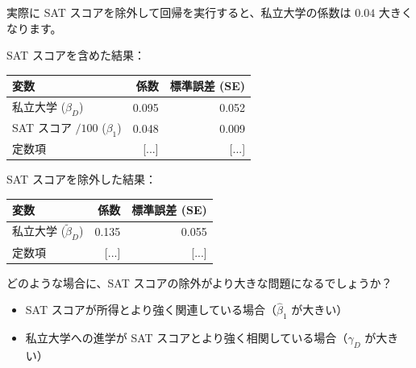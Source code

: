 \documentclass[11pt,handout]{beamer}
\newenvironment{wideitemize}{\itemize\addtolength{\itemsep}{10pt}}{\enditemize}
\begin{document}
\begin{frame}
	\begin{wideitemize}
		\item
		実際に SAT スコアを除外して回帰を実行すると、私立大学の係数は $0.04$ 大きくなります。
		
		\item
		SAT スコアを含めた結果：
		
		\begin{tabular}{lrr}
			変数 & 係数 & 標準誤差 (SE) \\ \hline
			私立大学 ($\beta_D$) & 0.095 & 0.052 \\
			SAT スコア $/ 100$ ($\beta_1$) & 0.048 & 0.009 \\
			定数項 & [...] & [...]
		\end{tabular}
		
		
		\item
		SAT スコアを除外した結果：
		\begin{tabular}{lrr}
			変数 & 係数 & 標準誤差 (SE) \\ \hline
			私立大学 ($\tilde\beta_D$) & 0.135 & 0.055 \\
			定数項 & [...] & [...]
		\end{tabular}
		
		\pause
		\item
		どのような場合に、SAT スコアの除外がより大きな問題になるでしょうか？ \pause
		\begin{itemize}
			\item 
			SAT スコアが所得とより強く関連している場合（$\hat\beta_1$ が大きい）
			
			\pause
			\item
			私立大学への進学が SAT スコアとより強く相関している場合（$\hat\gamma_D$ が大きい）
		\end{itemize}
		
	\end{wideitemize}
\end{frame}
\end{document}
